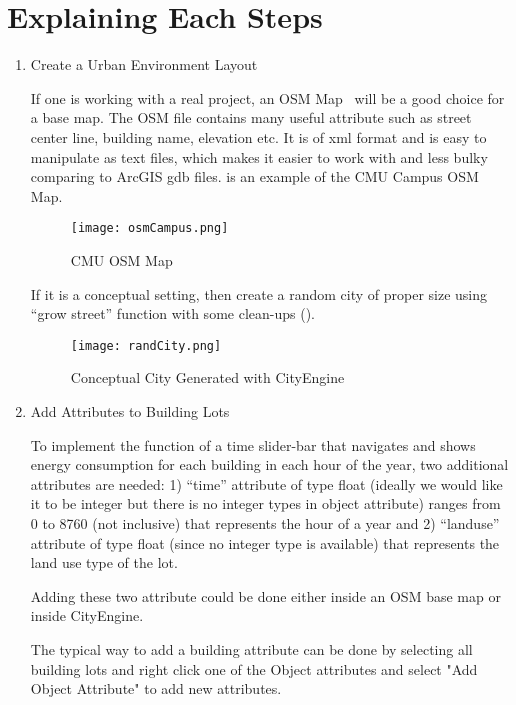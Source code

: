 \section{Explaining Each Steps}
\begin{enumerate}[1)]
\item{Create a Urban Environment Layout}

  If one is working with a real project, an OSM Map~\cite{OSM2015}
  will be a good choice for a base map. The OSM file contains many
  useful attribute such as street center line, building name,
  elevation etc. It is of xml format and is easy to manipulate as text
  files, which makes it easier to work with and less bulky comparing
  to ArcGIS gdb files.  is an example of the CMU
  Campus OSM Map.

  \begin{figure}[h!]
    \centering
    \texttt{[image: osmCampus.png]}
    \caption[CMU OSM Map]{CMU OSM Map~\cite{OSM2015}}
    \label{fig:osmCampus}
  \end{figure}

  If it is a conceptual setting, then create a random city of proper
  size using ``grow street'' function with some clean-ups
  ().

  \begin{figure}[h!]
    \centering
    \texttt{[image: randCity.png]}
    \caption[Conceptual City Lots]{Conceptual City Generated with
      CityEngine}
    \label{fig:randCity}
  \end{figure}

\item{Add Attributes to Building Lots} 

  To implement the function of a time slider-bar that navigates and
  shows energy consumption for each building in each hour of the year,
  two additional attributes are needed: 1) ``time'' attribute of type
  float (ideally we would like it to be integer but there is no
  integer types in object attribute) ranges from 0 to 8760 (not
  inclusive) that represents the hour of a year and 2) ``landuse''
  attribute of type float (since no integer type is available) that
  represents the land use type of the lot.

  Adding these two attribute could be done either inside an OSM base
  map or inside CityEngine.

  The typical way to add a building attribute can be done by selecting
  all building lots and right click one of the Object attributes and
  select "Add Object Attribute" to add new attributes.


\end{enumerate}
